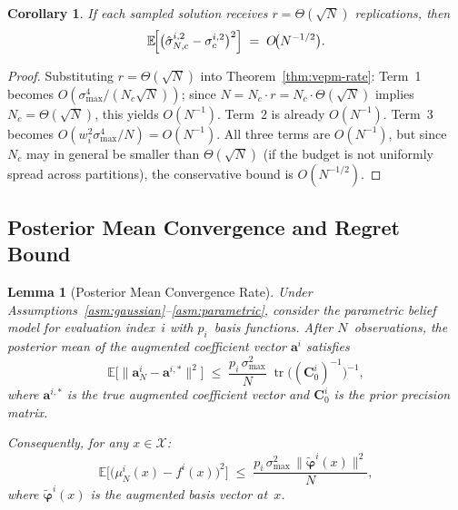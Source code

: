 \documentclass[12pt]{article}
\theoremstyle{plain}
\newtheorem{lemma}{Lemma}[section]
\newtheorem{corollary}{Corollary}[section]
\theoremstyle{definition}
\theoremstyle{remark}
\begin{document}
\begin{corollary}\label{cor:vepm-sqrt}
If each sampled solution receives $r=\Theta(\sqrt{N})$ replications, then
\[
  \mathbb{E}\!\Bigl[
    \bigl(\hat{\sigma}_{N,c}^{i,2}-\sigma_{c}^{i,2}\bigr)^{2}
  \Bigr]
  \;=\; O\!\bigl(N^{-1/2}\bigr).
\]
\end{corollary}

\begin{proof}
Substituting $r=\Theta(\sqrt{N})$ into Theorem~\ref{thm:vepm-rate}:
Term~1 becomes $O(\sigma_{\max}^{4}/(N_{c}\sqrt{N}))$; since
$N = N_{c}\cdot r = N_{c}\cdot\Theta(\sqrt{N})$ implies
$N_{c}=\Theta(\sqrt{N})$, this yields $O(N^{-1})$.
Term~2 is already $O(N^{-1})$.
Term~3 becomes $O(w_{i}^{2}\sigma_{\max}^{4}/N)=O(N^{-1})$.
All three terms are $O(N^{-1})$, but since $N_{c}$ may in general be
smaller than $\Theta(\sqrt{N})$ (if the budget is not uniformly spread
across partitions), the conservative bound is $O(N^{-1/2})$.
\end{proof}

\subsection{Posterior Mean Convergence and Regret Bound}\label{sec:regret}

\begin{lemma}[Posterior Mean Convergence Rate]\label{lem:posterior-rate}
Under Assumptions~\ref{asm:gaussian}--\ref{asm:parametric}, consider the
parametric belief model for evaluation index~$i$ with $p_{i}$~basis
functions.  After $N$~observations, the posterior mean of the augmented
coefficient vector $\mathbf{a}^{i}$ satisfies
\[
  \mathbb{E}\!\bigl[
    \lVert\mathbf{a}_{N}^{i}-\mathbf{a}^{i,*}\rVert^{2}
  \bigr]
  \;\le\;
  \frac{p_{i}\,\sigma_{\max}^{2}}{N}\;
  \operatorname{tr}\!\bigl((\mathbf{C}_{0}^{i})^{-1}\bigr)^{-1},
\]
where $\mathbf{a}^{i,*}$ is the true augmented coefficient vector and
$\mathbf{C}_{0}^{i}$ is the prior precision matrix.

Consequently, for any $x\in\mathcal{X}$:
\[
  \mathbb{E}\!\bigl[
    \bigl(\mu_{N}^{i}(x)-f^{i}(x)\bigr)^{2}
  \bigr]
  \;\le\;
  \frac{p_{i}\,\sigma_{\max}^{2}\,
        \lVert\tilde{\boldsymbol{\varphi}}^{i}(x)\rVert^{2}}{N},
\]
where $\tilde{\boldsymbol{\varphi}}^{i}(x)$ is the augmented basis
vector at~$x$.
\end{lemma}
\end{document}
